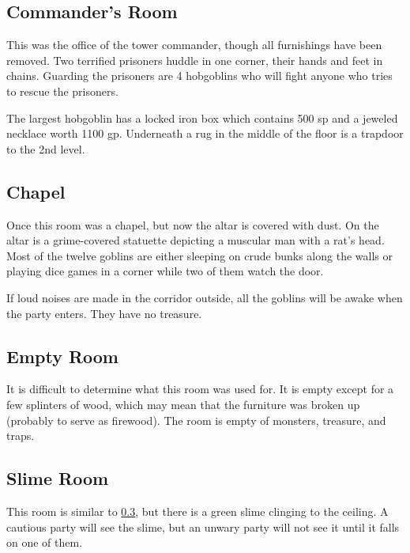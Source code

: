 \documentclass[letterpaper,serif]{rpg-module}
\begin{document}
\subsection{Commander's Room}

This was the office of the tower commander, though all furnishings have been
removed. Two terrified prisoners huddle in one corner, their hands and feet in
chains. Guarding the prisoners are 4 hobgoblins who will fight anyone
who tries to rescue the prisoners.


The largest hobgoblin has a locked iron box which contains 500 sp
and a jeweled necklace worth 1100 gp. Underneath a rug in the middle
of the floor is a trapdoor to the 2nd level.

\subsection{Chapel}

Once this room was a chapel, but now the altar is covered with dust. On the altar
is a grime-covered statuette depicting a muscular man with a rat's head. Most of
the twelve goblins are either sleeping on crude bunks along the walls or playing
dice games in a corner while two of them watch the door.


If loud noises are made in the corridor outside, all the goblins will be awake
when the party enters. They have no treasure.

\subsection{Empty Room}
\label{empty_room}

It is difficult to determine what this room was used for. It is empty except for
a few splinters of wood, which may mean that the furniture was broken up (probably
to serve as firewood). The room is empty of monsters, treasure, and traps.

\subsection{Slime Room}

This room is similar to \ref{empty_room}, but there is a green slime clinging to the
ceiling. A cautious party will see the slime, but an unwary party will not see it
until it falls on one of them.
\end{document}
